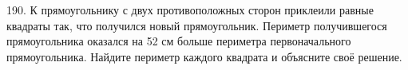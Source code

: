 190.  К прямоугольнику с двух противоположных сторон приклеили равные квадраты так, что получился новый прямоугольник. Периметр получившегося прямоугольника оказался на 52 см больше периметра первоначального прямоугольника. Найдите периметр каждого квадрата и объясните своё решение.\\
